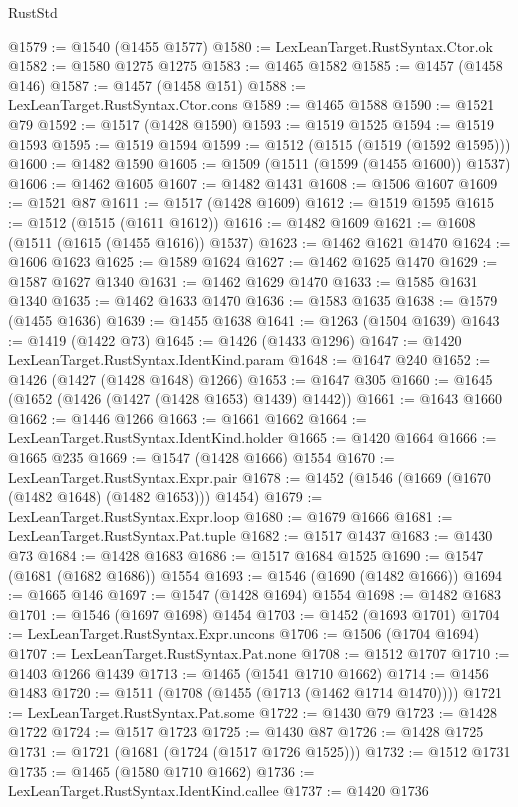\begin{lexlean}{RustStd}
\begin{coremodule}
@1579 := @1540 (@1455 @1577)
@1580 := LexLeanTarget.RustSyntax.Ctor.ok
@1582 := @1580 @1275 @1275
@1583 := @1465 @1582
@1585 := @1457 (@1458 @146)
@1587 := @1457 (@1458 @151)
@1588 := LexLeanTarget.RustSyntax.Ctor.cons
@1589 := @1465 @1588
@1590 := @1521 @79
@1592 := @1517 (@1428 @1590)
@1593 := @1519 @1525
@1594 := @1519 @1593
@1595 := @1519 @1594
@1599 := @1512 (@1515 (@1519 (@1592 @1595)))
@1600 := @1482 @1590
@1605 := @1509 (@1511 (@1599 (@1455 @1600)) @1537)
@1606 := @1462 @1605
@1607 := @1482 @1431
@1608 := @1506 @1607
@1609 := @1521 @87
@1611 := @1517 (@1428 @1609)
@1612 := @1519 @1595
@1615 := @1512 (@1515 (@1611 @1612))
@1616 := @1482 @1609
@1621 := @1608 (@1511 (@1615 (@1455 @1616)) @1537)
@1623 := @1462 @1621 @1470
@1624 := @1606 @1623
@1625 := @1589 @1624
@1627 := @1462 @1625 @1470
@1629 := @1587 @1627 @1340
@1631 := @1462 @1629 @1470
@1633 := @1585 @1631 @1340
@1635 := @1462 @1633 @1470
@1636 := @1583 @1635
@1638 := @1579 (@1455 @1636)
@1639 := @1455 @1638
@1641 := @1263 (@1504 @1639)
@1643 := @1419 (@1422 @73)
@1645 := @1426 (@1433 @1296)
@1647 := @1420 LexLeanTarget.RustSyntax.IdentKind.param
@1648 := @1647 @240
@1652 := @1426 (@1427 (@1428 @1648) @1266)
@1653 := @1647 @305
@1660 := @1645 (@1652 (@1426 (@1427 (@1428 @1653) @1439) @1442))
@1661 := @1643 @1660
@1662 := @1446 @1266
@1663 := @1661 @1662
@1664 := LexLeanTarget.RustSyntax.IdentKind.holder
@1665 := @1420 @1664
@1666 := @1665 @235
@1669 := @1547 (@1428 @1666) @1554
@1670 := LexLeanTarget.RustSyntax.Expr.pair
@1678 := @1452 (@1546 (@1669 (@1670 (@1482 @1648) (@1482 @1653))) @1454)
@1679 := LexLeanTarget.RustSyntax.Expr.loop
@1680 := @1679 @1666
@1681 := LexLeanTarget.RustSyntax.Pat.tuple
@1682 := @1517 @1437
@1683 := @1430 @73
@1684 := @1428 @1683
@1686 := @1517 @1684 @1525
@1690 := @1547 (@1681 (@1682 @1686)) @1554
@1693 := @1546 (@1690 (@1482 @1666))
@1694 := @1665 @146
@1697 := @1547 (@1428 @1694) @1554
@1698 := @1482 @1683
@1701 := @1546 (@1697 @1698) @1454
@1703 := @1452 (@1693 @1701)
@1704 := LexLeanTarget.RustSyntax.Expr.uncons
@1706 := @1506 (@1704 @1694)
@1707 := LexLeanTarget.RustSyntax.Pat.none
@1708 := @1512 @1707
@1710 := @1403 @1266 @1439
@1713 := @1465 (@1541 @1710 @1662)
@1714 := @1456 @1483
@1720 := @1511 (@1708 (@1455 (@1713 (@1462 @1714 @1470))))
@1721 := LexLeanTarget.RustSyntax.Pat.some
@1722 := @1430 @79
@1723 := @1428 @1722
@1724 := @1517 @1723
@1725 := @1430 @87
@1726 := @1428 @1725
@1731 := @1721 (@1681 (@1724 (@1517 @1726 @1525)))
@1732 := @1512 @1731
@1735 := @1465 (@1580 @1710 @1662)
@1736 := LexLeanTarget.RustSyntax.IdentKind.callee
@1737 := @1420 @1736

\end{coremodule}
\end{lexlean}
